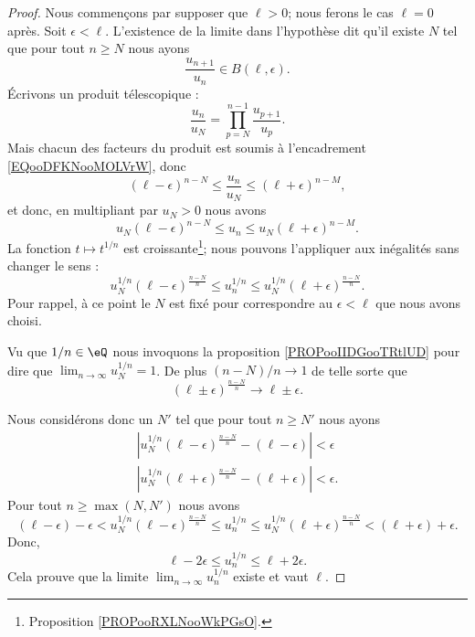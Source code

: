 \begin{proof}
	Nous commençons par supposer que \( \ell>0\); nous ferons le cas \( \ell=0\) après. Soit \( \epsilon<\ell\). L'existence de la limite dans l'hypothèse dit qu'il existe \( N\) tel que pour tout \( n\geq N\) nous ayons
	\begin{equation}        \label{EQooDFKNooMOLVrW}
		\frac{ u_{n+1} }{ u_n }\in B(\ell,\epsilon).
	\end{equation}
	Écrivons un produit télescopique :
	\begin{equation}
		\frac{ u_n }{ u_N }=\prod_{p=N}^{n-1}\frac{ u_{p+1} }{ u_p }.
	\end{equation}
	Mais chacun des facteurs du produit est soumis à l'encadrement \eqref{EQooDFKNooMOLVrW}, donc
	\begin{equation}
		(\ell-\epsilon)^{n-N}\leq \frac{ u_n }{ u_N }\leq (\ell+\epsilon)^{n-M},
	\end{equation}
	et donc, en multipliant par \( u_N>0\) nous avons
	\begin{equation}
		u_N(\ell-\epsilon)^{n-N}\leq  u_n  \leq u_N (\ell+\epsilon)^{n-M}.
	\end{equation}
	La fonction \( t\mapsto t^{1/n}\) est croissante\footnote{Proposition \ref{PROPooRXLNooWkPGsO}.}; nous pouvons l'appliquer aux inégalités sans changer le sens :
	\begin{equation}
		u_N^{1/n}(\ell-\epsilon)^{\frac{ n-N }{ n }}\leq u_n^{1/n}\leq u_N^{1/n}(\ell+\epsilon)^{\frac{ n-N }{ n }}.
	\end{equation}
	Pour rappel, à ce point le \( N\) est fixé pour correspondre au \( \epsilon<\ell\) que nous avons choisi.

	Vu que \( 1/n\in \eQ\) nous invoquons la proposition \ref{PROPooIIDGooTRtlUD} pour dire que \( \lim_{n\to \infty} u_N^{1/n}=1\). De plus \( (n-N)/n\to 1\) de telle sorte que
	\begin{equation}
		(\ell\pm \epsilon)^{\frac{ n-N }{ n }}\to\ell\pm\epsilon.
	\end{equation}

	Nous considérons donc un \( N'\) tel que pour tout \( n\geq N'\) nous ayons
	\begin{subequations}
		\begin{align}
			\left| u_N^{1/n}(\ell-\epsilon)^{\frac{ n-N }{ n }}-(\ell-\epsilon) \right| <\epsilon \\
			\left| u_N^{1/n}(\ell+\epsilon)^{\frac{ n-N }{ n }}-(\ell+\epsilon) \right| <\epsilon.
		\end{align}
	\end{subequations}
	Pour tout \( n\geq\max(N,N')\) nous avons
	\begin{equation}
		(\ell-\epsilon)-\epsilon<u_N^{1/n}(\ell-\epsilon)^{\frac{ n-N }{ n }}\leq u_n^{1/n}\leq u_N^{1/n}(\ell+\epsilon)^{\frac{ n-N }{ n }}<(\ell+\epsilon)+\epsilon.
	\end{equation}
	Donc,
	\begin{equation}
		\ell-2\epsilon\leq u_n^{1/n}\leq \ell+2\epsilon.
	\end{equation}
	Cela prouve que la limite \( \lim_{n\to \infty} u_n^{1/n}\) existe et vaut \( \ell\).


\end{proof}
